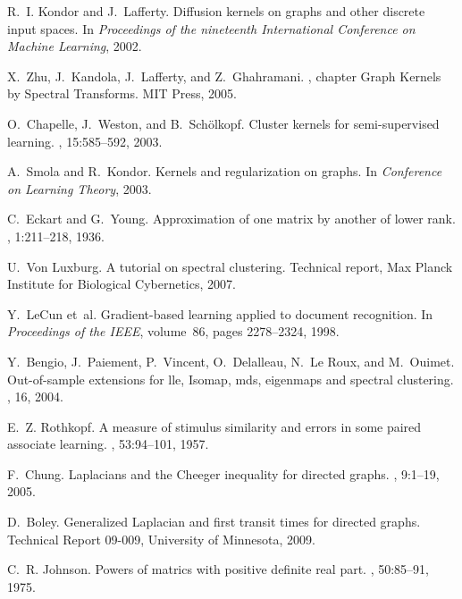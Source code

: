 \documentclass[10pt,twocolumn]{article}
\numberwithin{equation}{section}
\begin{document}
\begin{thebibliography}{10}
R.~I. Kondor and J.~Lafferty.
\newblock Diffusion kernels on graphs and other discrete input spaces.
\newblock In {\em Proceedings of the nineteenth International Conference on
  Machine Learning}, 2002.

X.~Zhu, J.~Kandola, J.~Lafferty, and Z.~Ghahramani.
, chapter Graph Kernels by Spectral
  Transforms.
\newblock MIT Press, 2005.

O.~Chapelle, J.~Weston, and B.~Sch\"{o}lkopf.
\newblock Cluster kernels for semi-supervised learning.
, 15:585--592,
  2003.

A.~Smola and R.~Kondor.
\newblock Kernels and regularization on graphs.
\newblock In {\em Conference on Learning Theory}, 2003.

C.~Eckart and G.~Young.
\newblock Approximation of one matrix by another of lower rank.
, 1:211--218, 1936.

U.~Von Luxburg.
\newblock A tutorial on spectral clustering.
\newblock Technical report, Max Planck Institute for Biological Cybernetics,
  2007.

Y.~Le{C}un et~al.
\newblock Gradient-based learning applied to document recognition.
\newblock In {\em Proceedings of the {IEEE}}, volume~86, pages 2278--2324,
  1998.

Y.~Bengio, J.~Paiement, P.~Vincent, O.~Delalleau, N.~Le Roux, and M.~Ouimet.
\newblock Out-of-sample extensions for lle, {I}somap, mds, eigenmaps and
  spectral clustering.
, 16, 2004.

E.~Z. Rothkopf.
\newblock A measure of stimulus similarity and errors in some paired associate
  learning.
, 53:94--101, 1957.

F.~Chung.
\newblock Laplacians and the {C}heeger inequality for directed graphs.
, 9:1--19, 2005.

D.~Boley.
\newblock Generalized {L}aplacian and first transit times for directed graphs.
\newblock Technical Report 09-009, University of Minnesota, 2009.

C.~R. Johnson.
\newblock Powers of matrics with positive definite real part.
, 50:85--91,
  1975.

\end{thebibliography}
\end{document}
